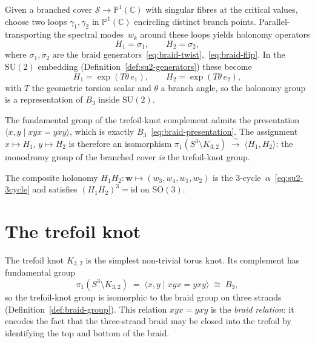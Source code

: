 \begin{remark}
\label{rem:holonomy-trefoil}
Given a branched cover $\mathcal{S}\to\mathbb{P}^1(\mathbb{C})$ with singular fibres
at the critical values, choose two loops
$\gamma_1,\gamma_2$ in $\mathbb{P}^1(\mathbb{C})$ encircling distinct branch
points.  Parallel-transporting the spectral modes~$w_k$ around these
loops yields holonomy operators
\begin{equation}\label{eq:holonomy-generators}
  H_1=\sigma_1,\qquad H_2=\sigma_2,
\end{equation}
where $\sigma_1,\sigma_2$ are the braid
generators~\eqref{eq:braid-twist},~\eqref{eq:braid-flip}.  In the
$\mathrm{SU}(2)$ embedding (Definition~\ref{def:su2-generators}) these
become
\[
  H_1=\exp(T\theta\,e_1),\qquad H_2=\exp(T\theta\,e_2),
\]
with $T$ the geometric torsion scalar and $\theta$ a branch angle, so
the holonomy group is a representation of $B_3$ inside
$\mathrm{SU}(2)$.

The fundamental group of the trefoil-knot complement admits the
presentation $\langle x,y\mid xyx=yxy\rangle$, which is exactly
$B_3$~\eqref{eq:braid-presentation}.  The assignment
$x\mapsto H_1$, $y\mapsto H_2$ is therefore an isomorphism
$\pi_1(S^3\setminus K_{3,2})\;\xrightarrow{\;\sim\;}\;
\langle H_1,H_2\rangle$: the monodromy group of the branched cover
\emph{is} the trefoil-knot group.

The composite holonomy
$H_1 H_2\colon\mathbf{w}\mapsto(w_3,w_4,w_1,w_2)$ is the
$3$-cycle~$\alpha$~\eqref{eq:su2-3cycle} and satisfies
$(H_1 H_2)^3=\mathrm{id}$ on $\mathrm{SO}(3)$.
\end{remark}


\section{The trefoil knot}
\label{sec:trefoil-knot}

\begin{remark}
\label{rem:trefoil-knot-group}
The trefoil knot $K_{3,2}$ is the simplest non-trivial torus knot.  Its
complement has fundamental group
\[
  \pi_1(S^3\setminus K_{3,2})
  \;=\;\langle x,y\mid xyx=yxy\rangle
  \;\cong\;B_3,
\]
so the trefoil-knot group is isomorphic to the braid group on three
strands (Definition~\ref{def:braid-group}).  This relation $xyx=yxy$ is
the \emph{braid relation}: it encodes the fact that the three-strand
braid may be closed into the trefoil by identifying the top and bottom of
the braid.
\end{remark}

